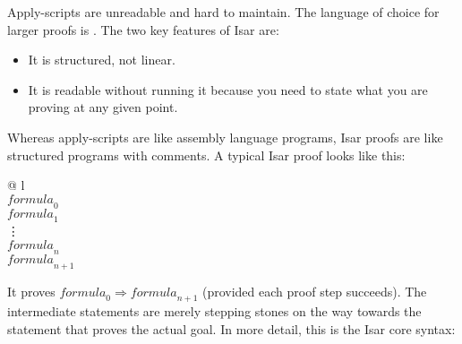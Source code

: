 %
\begin{isabellebody}%
\def\isabellecontext{Isar}%
%
\isadelimtheory
%
\endisadelimtheory
%
\isatagtheory
%
\endisatagtheory
{\isafoldtheory}%
%
\isadelimtheory
%
\endisadelimtheory
%
\isadelimML
%
\endisadelimML
%
\isatagML
%
\endisatagML
{\isafoldML}%
%
\isadelimML
%
\endisadelimML
%
\begin{isamarkuptext}%
Apply-scripts are unreadable and hard to maintain. The language of choice
for larger proofs is . The two key features of Isar are:
\begin{itemize}
\item It is structured, not linear.
\item It is readable without running it because
you need to state what you are proving at any given point.
\end{itemize}
Whereas apply-scripts are like assembly language programs, Isar proofs
are like structured programs with comments. A typical Isar proof looks like this:%
\end{isamarkuptext}%
\isamarkuptrue%
%
\begin{isamarkuptext}%
\begin{tabular}{@ {}l}
\\
\quad{} $\mathit{formula}_0$\\
\quad{} $\mathit{formula}_1$ \quad{} \\
\quad\vdots\\
\quad{} $\mathit{formula}_n$ \quad{} \\
\quad{} $\mathit{formula}_{n+1}$ \quad{} \\
\end{tabular}%
\end{isamarkuptext}%
\isamarkuptrue%
%
\begin{isamarkuptext}%
It proves $\mathit{formula}_0 \Longrightarrow \mathit{formula}_{n+1}$
(provided each proof step succeeds).
The intermediate  statements are merely stepping stones
on the way towards the  statement that proves the actual
goal. In more detail, this is the Isar core syntax:
\medskip


\end{isamarkuptext}
\end{isabellebody}

